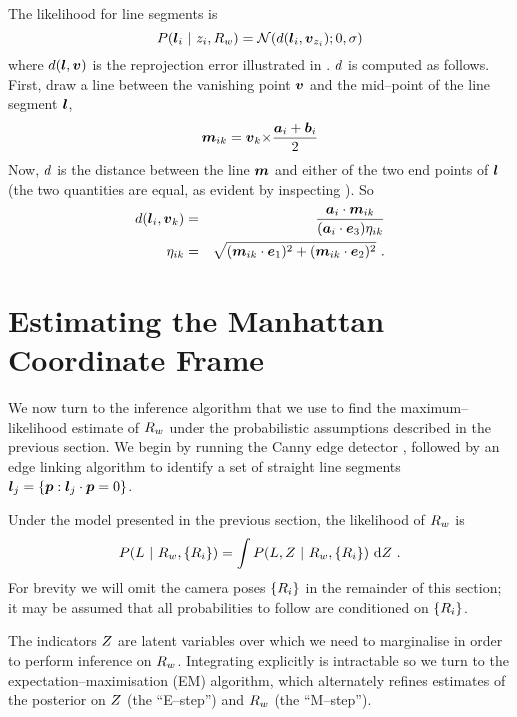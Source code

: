 The likelihood for line segments is
\begin{equation}
  P(\LineSeg_i ~|~ \Indicator_i,\SceneR) =
  \NormalDistr(\dist(\LineSeg_i,\vpt_{\Indicator_i}); 0, \sigma)
\end{equation}
where $\dist(\LineSeg,\vpt)$ is the reprojection error illustrated in
. $\dist$ is computed as follows. First,
draw a line between the vanishing point $\vpt$ and the mid--point of
the line segment $\LineSeg$,
\begin{equation}
  \ReprojLine_{ik} =
  \vpt_k \cross \frac{\StartPt_i+\EndPt_i}{2}
\end{equation}
Now, $\dist$ is the distance between the line $\ReprojLine$ and either
of the two end points of $\LineSeg$ (the two quantities are equal, as
evident by inspecting ). So
\begin{eqnarray}
  \dist(\LineSeg_i,\vpt_k) &=& 
  \frac
      {\StartPt_i \cdot \ReprojLine_{ik}}
      {(\StartPt_{i}\cdot\ez) \eta_{ik}}\\
      \eta_{ik} &=&
      \sqrt{(\ReprojLine_{ik} \cdot \ex)^2 +
        (\ReprojLine_{ik} \cdot \ey)^2}
      ~.
\end{eqnarray}

\section{Estimating the Manhattan Coordinate Frame}

We now turn to the inference algorithm that we use to find the
maximum--likelihood estimate of $\SceneR$ under the probabilistic
assumptions described in the previous section. We begin by running the
Canny edge detector \cite{Canny1986}, followed by an edge linking
algorithm \cite{Zhang02} to identify a set of straight line segments
$\LineSeg_j = \{\Pixel : \LineSeg_j\cdot\Pixel = 0\}$.

Under the model presented in the previous section, the
likelihood of $\SceneR$ is
\begin{equation}
  P(\LineSegs ~|~ \SceneR,\{\CamR_i\}) =
  \int P(\LineSegs,\Indicators ~|~ \SceneR,\{\CamR_i\})
  ~\intd\Indicators ~.
\end{equation}
For brevity we will omit the camera poses $\{\CamR_i\}$ in the
remainder of this section; it may be assumed that all probabilities
to follow are conditioned on $\{\CamR_i\}$.

The indicators $\Indicators$ are latent variables over which we need
to marginalise in order to perform inference on $\SceneR$. Integrating
explicitly is intractable so we turn to the
expectation--maximisation (EM) algorithm, which alternately refines
estimates of the posterior on $\Indicators$ (the ``E--step'') and
$\SceneR$ (the ``M--step'').

